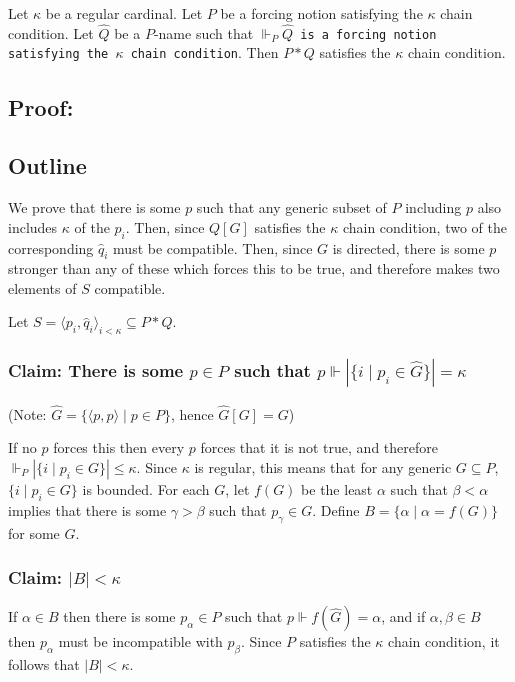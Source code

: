 \documentclass[12pt]{article}
\begin{document}
Let $\kappa$ be a regular cardinal.  Let $P$ be a forcing notion satisfying the $\kappa$ chain condition.  Let $\hat{Q}$ be a $P$-name such that $\Vdash_P \hat{Q}$\texttt{ is a forcing notion satisfying the }$\kappa$\texttt{ chain condition}.  Then $P*Q$ satisfies the $\kappa$ chain condition.

\subsection*{Proof:}
\subsection*{Outline}

We prove that there is some $p$ such that any generic subset of $P$ including $p$ also includes $\kappa$ of the $p_i$.  Then, since $Q[G]$ satisfies the $\kappa$ chain condition, two of the corresponding $\hat{q}_i$ must be compatible.  Then, since $G$ is directed, there is some $p$ stronger than any of these which forces this to be true, and therefore makes two elements of $S$ compatible.


Let $S=\langle p_i,\hat{q}_i\rangle_{i<\kappa}\subseteq P*Q$.

\subsubsection*{Claim: There is some $p\in P$ such that $p\Vdash |\{i\mid p_i\in \hat{G}\}|=\kappa$}

(Note: $\hat{G}=\{\langle p,p\rangle\mid p\in P\}$, hence $\hat{G}[G]=G$)

If no $p$ forces this then every $p$ forces that it is not true, and therefore $\Vdash_P |\{i\mid p_i\in G\}|\leq\kappa$.  Since $\kappa$ is regular, this means that for any generic $G\subseteq P$, $\{i\mid p_i\in G\}$ is bounded.  For each $G$, let $f(G)$ be the least $\alpha$ such that $\beta<\alpha$ implies that there is some $\gamma>\beta$ such that $p_\gamma\in G$.  Define $B=\{\alpha\mid \alpha=f(G)\}$ for some $G$.

\subsubsection*{Claim: $|B|<\kappa$}

If $\alpha\in B$ then there is some $p_\alpha\in P$ such that $p\Vdash f(\hat{G})=\alpha$, and if $\alpha,\beta\in B$ then $p_\alpha$ must be incompatible with $p_\beta$.  Since $P$ satisfies the $\kappa$ chain condition, it follows that $|B|<\kappa$.
\end{document}
